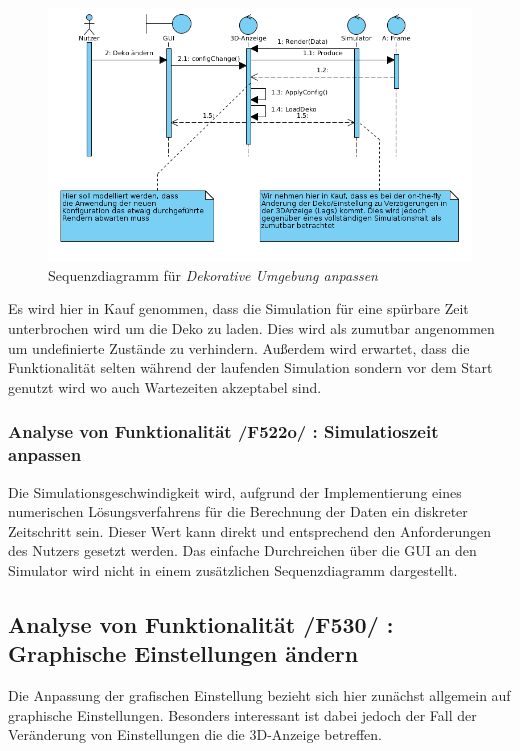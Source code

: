 \begin{figure}
\includegraphics[width=16cm]{bilder/change_graphic_deko}
\caption{Sequenzdiagramm für \textit{Dekorative Umgebung anpassen}}
\label{labelname}
\end{figure}
Es wird hier in Kauf genommen, dass die Simulation für eine spürbare Zeit unterbrochen wird um die Deko zu laden. Dies wird als zumutbar angenommen um undefinierte Zustände zu verhindern. 
Außerdem wird erwartet, dass die Funktionalität selten während der laufenden Simulation sondern vor dem Start genutzt wird wo auch Wartezeiten akzeptabel sind.

\subsubsection{Analyse von Funktionalität /F522o/ :  Simulatioszeit anpassen}
Die Simulationsgeschwindigkeit wird, aufgrund der Implementierung eines numerischen Lösungsverfahrens für die Berechnung der Daten ein diskreter Zeitschritt sein. Dieser Wert kann direkt und entsprechend
den Anforderungen des Nutzers gesetzt werden. Das einfache Durchreichen über die GUI an den Simulator wird nicht in einem zusätzlichen Sequenzdiagramm dargestellt.
\subsection{Analyse von Funktionalität /F530/ :  Graphische Einstellungen ändern}
Die Anpassung der grafischen Einstellung bezieht sich hier zunächst allgemein auf graphische Einstellungen. Besonders interessant ist dabei jedoch der Fall der Veränderung von Einstellungen die 
die 3D-Anzeige betreffen. 

